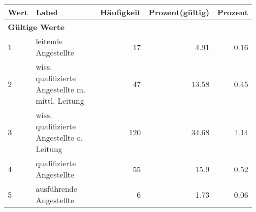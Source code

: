      \begin{longtable}{lXrrr}
     \toprule
     \textbf{Wert} & \textbf{Label} & \textbf{Häufigkeit} & \textbf{Prozent(gültig)} & \textbf{Prozent} \\
     \endhead
     \midrule
     \multicolumn{5}{l}{\textbf{Gültige Werte}}\\

     1 &
     \multicolumn{1}{X}{ leitende Angestellte   } &


       \num{17} &
       \num[round-mode=places,round-precision=2]{4.91} &
         \num[round-mode=places,round-precision=2]{0.16} \\

     2 &
     \multicolumn{1}{X}{ wiss. qualifizierte Angestellte m. mittl. Leitung   } &


       \num{47} &
       \num[round-mode=places,round-precision=2]{13.58} &
         \num[round-mode=places,round-precision=2]{0.45} \\

     3 &
     \multicolumn{1}{X}{ wiss. qualifizierte Angestellte o. Leitung   } &


       \num{120} &
       \num[round-mode=places,round-precision=2]{34.68} &
         \num[round-mode=places,round-precision=2]{1.14} \\

     4 &
     \multicolumn{1}{X}{ qualifizierte Angestellte   } &


       \num{55} &
       \num[round-mode=places,round-precision=2]{15.9} &
         \num[round-mode=places,round-precision=2]{0.52} \\

     5 &
     \multicolumn{1}{X}{ ausführende Angestellte   } &


       \num{6} &
       \num[round-mode=places,round-precision=2]{1.73} &
         \num[round-mode=places,round-precision=2]{0.06} \\


\end{longtable}
